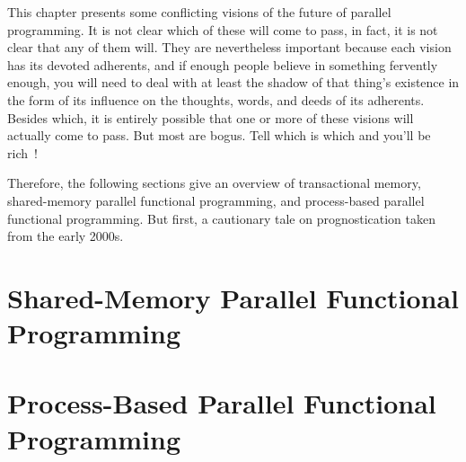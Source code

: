 

This chapter presents some conflicting visions of the future of parallel
programming.
It is not clear which of these will come to pass, in fact, it is not
clear that any of them will.
They are nevertheless important because each vision has its devoted
adherents, and if enough people believe in something fervently enough,
you will need to deal with at least the shadow of that thing's existence
in the form of its
influence on the thoughts, words, and deeds of its adherents.
Besides which, it is entirely possible that one or more of these visions
will actually come to pass.
But most are bogus.
Tell which is which and you'll be rich~\cite{KeithRSpitz1977}!

Therefore, the following sections give an overview of transactional
memory, shared-memory parallel functional programming, and
process-based parallel functional programming.
But first, a cautionary tale on prognostication taken from the early 2000s.




\section{Shared-Memory Parallel Functional Programming}
\label{sec:future:Shared-Memory Parallel Functional Programming}

\section{Process-Based Parallel Functional Programming}
\label{sec:future:Process-Based Parallel Functional Programming}
